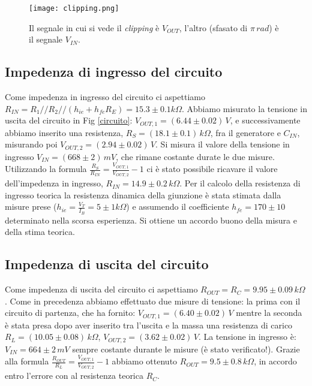 \documentclass[10pt,a4paper]{article}
\begin{document}
\begin{figure}[!htb]
  \centering
  \texttt{[image: clipping.png]}
\caption{Il segnale in cui si vede il \emph{clipping} è $V_{OUT}$, l'altro (sfasato di $\pi \, rad$) è il segnale $V_{IN}$.}
\label{clipping}
\end{figure}

\subsection{Impedenza di ingresso del circuito}
Come impedenza in ingresso del circuito ci aspettiamo $R_{IN}=R_1//R_2//(h_{ie}+h_{fe}R_E) = 15.3\pm0.1 k \Omega$.
Abbiamo misurato la tensione in uscita del circuito in Fig \ref{circuito}: $V_{OUT,1} = (6.44\pm0.02) \, V$, e successivamente abbiamo inserito una resistenza, $R_S= (18.1\pm0.1) \, k\Omega$, fra il generatore e $C_{IN}$, misurando poi $V_{OUT,2}= (2.94 \pm 0.02) \, V$. Si misura il valore della tensione in ingresso $V_{IN} = (668 \pm 2) \, mV$, che rimane costante durate le due misure. Utilizzando la formula $\frac{R_S}{R_{IN}}=\frac{V_{OUT,1}}{V_{OUT,2}}-1$ ci è stato possibile ricavare il valore dell'impedenza in ingresso, $R_{IN}= 14.9\pm0.2\, k\Omega$. 
Per il calcolo della resistenza di ingresso teorica la resistenza dinamica della giunzione è stata stimata dalla misure prese ($h_{ie} = \frac{V_T}{I_B} = 5 \pm 1 k\Omega$) e assumendo il coefficiente $h_{fe} = 170\pm10$ determinato nella scorsa esperienza. Si ottiene un accordo buono della misura e della stima teorica.

\subsection{Impedenza di uscita del circuito}
Come impedenza di uscita del circuito ci aspettiamo $R_{OUT}= R_C = 9.95\pm0.09\, k\Omega$. Come in precedenza abbiamo effettuato due misure di tensione: la prima con il circuito di partenza, che ha fornito:  $V_{OUT,1}= (6.40\pm0.02) \, V$ mentre la seconda è stata presa dopo aver inserito tra l'uscita e la massa una resistenza di carico $R_L = (10.05 \pm 0.08) \, k\Omega$, $V_{OUT,2}= (3.62\pm0.02)\,V$. La tensione in ingresso è: $V_{IN} = 664 \pm 2 \,mV$ sempre costante durante le misure (è stato verificato!). Grazie alla formula $\frac{R_{OUT}}{R_{L}}=\frac{V_{OUT,1}}{V_{OUT,2}}-1$ abbiamo ottenuto $R_{OUT}= 9.5\pm0.8\, k\Omega$, in accordo entro l'errore con al resistenza teorica $R_C$.
\end{document}
